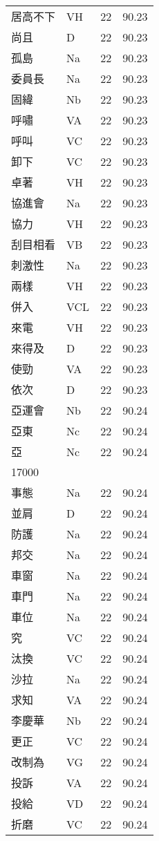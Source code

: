 \documentclass[twocolumn]{book}
\begin{document}
\begin{supertabular}{llrr}
居高不下 & VH & 22 &  90.23\\
尚且 & D & 22 &  90.23\\
孤島 & Na & 22 &  90.23\\
委員長 & Na & 22 &  90.23\\
固緯 & Nb & 22 &  90.23\\
呼嘯 & VA & 22 &  90.23\\
呼叫 & VC & 22 &  90.23\\
卸下 & VC & 22 &  90.23\\
卓著 & VH & 22 &  90.23\\
協進會 & Na & 22 &  90.23\\
協力 & VH & 22 &  90.23\\
刮目相看 & VB & 22 &  90.23\\
刺激性 & Na & 22 &  90.23\\
兩樣 & VH & 22 &  90.23\\
併入 & VCL & 22 &  90.23\\
來電 & VH & 22 &  90.23\\
來得及 & D & 22 &  90.23\\
使勁 & VA & 22 &  90.23\\
依次 & D & 22 &  90.23\\
亞運會 & Nb & 22 &  90.24\\
亞東 & Nc & 22 &  90.24\\
亞 & Nc & 22 &  90.24\\
17000\\
事態 & Na & 22 &  90.24\\
並肩 & D & 22 &  90.24\\
防護 & Na & 22 &  90.24\\
邦交 & Na & 22 &  90.24\\
車窗 & Na & 22 &  90.24\\
車門 & Na & 22 &  90.24\\
車位 & Na & 22 &  90.24\\
究 & VC & 22 &  90.24\\
汰換 & VC & 22 &  90.24\\
沙拉 & Na & 22 &  90.24\\
求知 & VA & 22 &  90.24\\
李慶華 & Nb & 22 &  90.24\\
更正 & VC & 22 &  90.24\\
改制為 & VG & 22 &  90.24\\
投訴 & VA & 22 &  90.24\\
投給 & VD & 22 &  90.24\\
折磨 & VC & 22 &  90.24\\

\end{supertabular}
\end{document}
